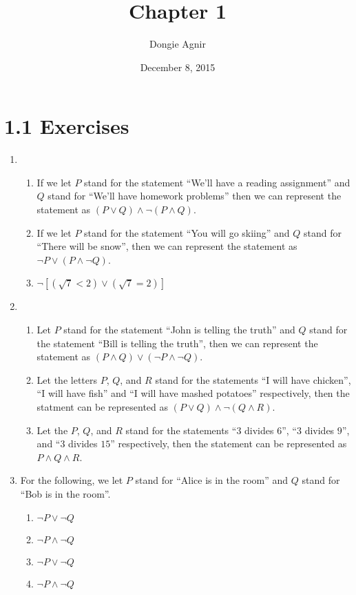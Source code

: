 \documentclass{article}
\title{Chapter 1}
\author{Dongie Agnir}
\date{December 8, 2015}
\begin{document}
\maketitle

\section*{1.1 Exercises}
\begin{enumerate}
\item
  \begin{enumerate}
  \item If we let $P$ stand for the statement ``We'll have a reading assignment'' and $Q$ stand for ``We'll have homework problems'' then we can represent the statement as $(P \lor Q) \land \lnot (P \land Q)$.
  \item If we let $P$ stand for the statement ``You will go skiing'' and $Q$ stand for ``There will be snow'', then we can represent the statement as $\lnot P \lor (P \land \lnot Q)$.
    \item $\lnot [(\sqrt{7} < 2) \lor (\sqrt{7} = 2)]$
  \end{enumerate}
\item
  \begin{enumerate}
  \item Let $P$ stand for the statement ``John is telling the truth'' and $Q$ stand for the statement ``Bill is telling the truth'', then we can represent the statement as $(P \land Q) \lor (\lnot P \land \lnot Q)$.
  \item Let the letters $P$, $Q$, and $R$ stand for the statements ``I will have chicken'', ``I will have fish'' and ``I will have mashed potatoes'' respectively, then the statment can be represented as $(P \lor Q) \land \lnot (Q \land R)$.
  \item Let the $P$, $Q$, and $R$ stand for the statements ``$3$ divides $6$'', ``$3$ divides $9$'', and ``$3$ divides $15$'' respectively, then the statement can be represented as $P \land Q \land R$.
  \end{enumerate}
\item For the following, we let $P$ stand for ``Alice is in the room'' and $Q$ stand for ``Bob is in the room''.
  \begin{enumerate}
  \item $\lnot P \lor \lnot Q$
  \item $\lnot P \land \lnot Q$
  \item $\lnot P \lor \lnot Q$
    \item $\lnot P \land \lnot Q$

\end{enumerate}
\end{enumerate}
\end{document}
